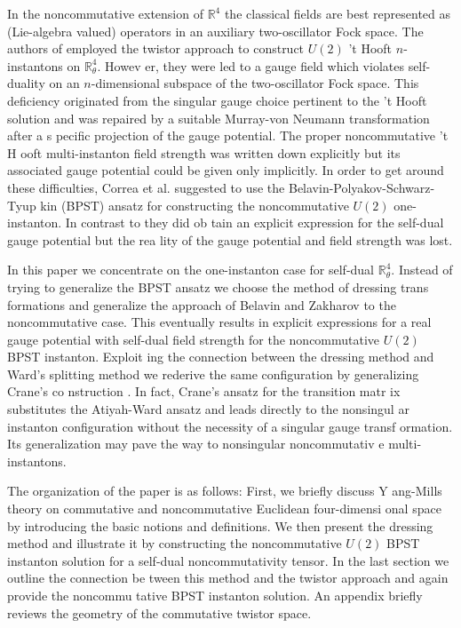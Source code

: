 \documentclass[a4paper,11pt,english]{article}
\numberwithin{equation}{section}
\renewcommand{\=}{\ =\ }
\begin{document}
In the noncommutative extension of $\mathbb{R}^4$ 
the classical fields are best represented
as (Lie-algebra valued) operators in an auxiliary two-oscillator Fock space.
The authors of \cite{Lechtenfeld:2001ie} employed the twistor approach to %
 construct $U(2)$ 't Hooft $n$-instantons on $\mathbb{R}^4_\theta$. Howev%
er, they were led to a gauge field which violates self-duality on an %
 $n$-dimensional subspace of the two-oscillator Fock space. This deficiency 
originated from the singular gauge choice pertinent to the 't Hooft solution
and was repaired by a suitable Murray-von Neumann transformation after a s%
pecific projection of the gauge potential. The proper noncommutative 't H%
ooft multi-instanton field strength was written down explicitly but its %
associated gauge potential could be given only implicitly. 
In order to get around these difficulties, Correa et al. \cite{Correa:2001wv} 
suggested to use the Belavin-Polyakov-Schwarz-Tyup%
kin (BPST) \cite{Belavin:fg} ansatz for constructing the noncommutative $%
U(2)$ one-instanton. In contrast to \cite{Lechtenfeld:2001ie} they did ob%
tain an explicit expression for the self-dual gauge potential but the rea%
lity of the gauge potential and field strength was lost.  

In this paper we concentrate on the one-instanton case for 
self-dual $\mathbb{R}^4_\theta$. Instead of trying %
 to generalize the BPST ansatz \cite{Belavin:fg} 
we choose the method of dressing trans%
formations and generalize the approach of Belavin and Zakharov 
\cite{Belavin:cz} to the noncommutative case. 
This eventually results in explicit 
expressions for a real gauge potential with self-dual field strength for 
the noncommutative $U(2)$ BPST instanton. Exploit%
ing the connection between the dressing method and Ward's splitting method we %
 rederive the same configuration by generalizing Crane's co%
nstruction \cite{Crane:im}. In fact, Crane's ansatz for the transition matr%
ix substitutes the Atiyah-Ward ansatz and leads directly to the nonsingul%
ar instanton configuration without the necessity of a singular gauge transf%
ormation. Its generalization may pave the way to nonsingular noncommutativ%
e multi-instantons.

The organization of the paper is as follows: First, we briefly discuss Y%
ang-Mills theory on commutative and noncommutative Euclidean four-dimensi%
onal space by introducing the basic notions and definitions. We then present %
the dressing method and illustrate it by constructing the noncommutative  
$U(2)$ BPST instanton solution for a self-dual noncommutativity tensor.  
In the last section we outline the connection be%
tween this method and the twistor approach and again provide the noncommu%
tative BPST instanton solution. An appendix briefly reviews the geometry of the
commutative twistor space.
\end{document}
